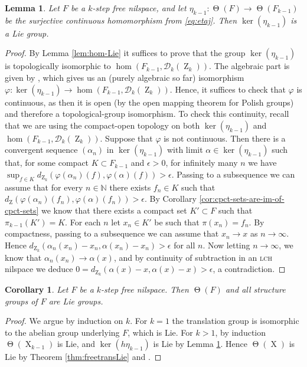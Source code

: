 \documentclass[a4paper,12pt,reqno]{amsart}
\newtheorem{lemma}[theorem]{Lemma}
\newtheorem{corollary}[theorem]{Corollary}
\theoremstyle{definition}
\def\to{\rightarrow}
\newcommand{\mc}{\mathcal}
\newcommand{\mb}{\mathbb}
\DeclareMathOperator{\ab}{Z}
\DeclareMathOperator{\tran}{\Theta}
\DeclareMathOperator{\ns}{X}
\begin{document}
\begin{lemma}\label{lem:ker-h-Lie}
Let $F$ be a $k$-step free nilspace, and let $\eta_{k-1}:\tran(F)\to\tran(F_{k-1})$ be the surjective continuous homomorphism from \eqref{eq:etaj}. Then $\ker(\eta_{k-1})$ is a Lie group.
\end{lemma}
\begin{proof}
By Lemma \ref{lem:hom-Lie} it suffices to prove that the group $\ker(\eta_{k-1})$ is topologically isomorphic to $\hom(F_{k-1},\mc{D}_k(\ab_k))$. The algebraic part is given by \cite[Lemma 2.9.5]{Cand:Notes2}, which gives us an (purely algebraic so far) isomorphism $\varphi:\ker(\eta_{k-1})\to \hom(F_{k-1},\mc{D}_k(\ab_k))$. Hence, it suffices to check that $\varphi$ is continuous, as then it is open (by the open mapping theorem for Polish groups) and therefore a topological-group isomorphism. To check this continuity, recall that we are using the compact-open topology on both $\ker(\eta_{k-1})$ and $\hom(F_{k-1},\mc{D}_k(\ab_k))$. Suppose that $\varphi$ is not continuous. Then there is a convergent sequence $(\alpha_n)$ in $\ker(\eta_{k-1})$ with limit $\alpha\in \ker(\eta_{k-1})$ such that, for some compact $K\subset F_{k-1}$ and $\epsilon>0$, for infinitely many $n$ we have $\sup_{f\in K}d_{\ab_k}(\varphi(\alpha_n)(f),\varphi(\alpha)(f))>\epsilon$. Passing to a subsequence we can assume that for every $n\in \mb{N}$ there exists $f_n\in K$ such that $d_{\ab}(\varphi(\alpha_n)(f_n),\varphi(\alpha)(f_n))>\epsilon$. By Corollary \ref{cor:cpct-sets-are-im-of-cpct-sets} we know that there exists a compact set $K'\subset F$ such that $\pi_{k-1}(K')=K$. For each $n$ let $x_n\in K'$ be such that $\pi(x_n)=f_n$. By compactness, passing to a subsequence we can assume that $x_n\to x$ as $n\to\infty$. Hence $d_{\ab_k}(\alpha_n(x_n)-x_n,\alpha(x_n)-x_n)>\epsilon$ for all $n$. Now letting $n\to \infty$, we know that $\alpha_n(x_n)\to \alpha(x)$, and by continuity of subtraction in an \textsc{lch} nilspace we deduce $0=d_{\ab_k}(\alpha(x)-x,\alpha(x)-x)>\epsilon$, a contradiction.
\end{proof}

\begin{corollary}\label{cor:trans&structFree}
Let $F$ be a $k$-step free nilspace. Then $\tran(F)$ and all structure groups of $F$ are Lie groups.
\end{corollary}
\begin{proof}
We argue by induction on $k$. For $k=1$ the translation group is isomorphic to the abelian group underlying $F$, which is Lie. For $k>1$, by induction $\tran(\ns_{k-1})$ is  Lie, and $\ker(h\eta_{k-1})$ is Lie by Lemma \ref{lem:ker-h-Lie}. Hence $\tran(\ns)$ is Lie by Theorem \ref{thm:freetransLie} and \cite[Theorem 2.6]{Mosk}.
\end{proof}
\end{document}
